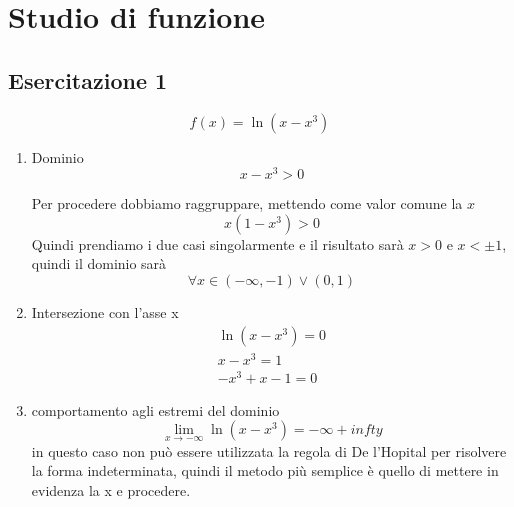 \section{Studio di funzione}
\subsection{Esercitazione 1}
\begin{equation}
	f(x)=\ln\left(x-x^3\right)
\end{equation}
\begin{enumerate}
	\item Dominio
	\begin{equation*}
		x-x^3>0
	\end{equation*}
	
	Per procedere dobbiamo raggruppare, mettendo come valor comune la $x$
	\begin{equation*}
		x(1-x^3)>0
	\end{equation*}
	Quindi prendiamo i due casi singolarmente e il risultato sarà $x>0$ e $x<\pm1$, quindi il dominio sarà
	\begin{equation*}
		\forall x\in (-\infty,-1) \vee (0,1)
	\end{equation*}
	\item Intersezione con l'asse x
		\begin{equation*}
			\begin{matrix}
				\ln\left(x-x^3\right)=0\\
				x-x^3=1\\
				-x^3+x-1=0
			\end{matrix}
		\end{equation*}
	\item comportamento agli estremi del dominio
		\begin{equation*}
			\lim_{x\to -\infty}\ln\left(x-x^3\right)=-\infty+infty
		\end{equation*}
		in questo caso non può essere utilizzata la regola di De l'Hopital per risolvere la forma indeterminata, quindi il metodo più semplice è quello di mettere in evidenza la x e procedere.
		

\end{enumerate}
